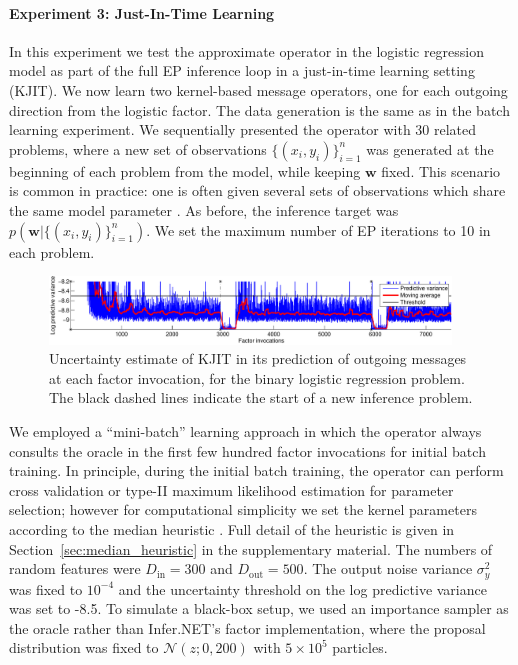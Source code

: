 \documentclass[english]{article}
\theoremstyle{plain}
\theoremstyle{plain}
\newcommand{\wjnote}[1]{ }
\newcommand{\secref}[1]{Section~\ref{#1}}
\begin{document}
\paragraph{Experiment 3: Just-In-Time Learning}
In this experiment we test the approximate operator in the logistic regression model as part of the full EP inference loop in a just-in-time learning setting (KJIT). %
We now learn two kernel-based message operators, one for each outgoing 
direction from the logistic factor. 
The data generation is the same as in the batch learning experiment.
We sequentially presented the operator with 30 related problems, where a new 
set of observations $\{(x_i, y_i)\}_{i=1}^n$ was generated at the beginning of 
each problem from the model, while keeping $\boldsymbol{w}$ fixed.
This scenario is common in practice: one is often given several sets of 
observations which share the same model parameter \citep{Eslami2014}. 
As before, the inference target was $p(\boldsymbol{w}|\{(x_i, y_i)\}_{i=1}^n)$.
We set the maximum number of EP iterations to 10 in each problem.

\begin{figure}[t]
\centering
\includegraphics[width=0.95\textwidth]{img/online/logistic_temporal_uncertainty-crop}
\caption{Uncertainty estimate of KJIT in its prediction of outgoing messages at each factor invocation,
for the binary logistic regression problem. The black dashed lines indicate the start 
of a new inference problem.
\label{fig:logistic_temporal_uncertainty}
}
\end{figure}


We employed a ``mini-batch'' learning approach in which the operator always consults the oracle in
the first few hundred factor invocations for initial batch training. 
In principle, during the initial batch training, the operator can perform 
cross validation or type-II maximum likelihood estimation for parameter
selection; however for computational simplicity
we set the kernel parameters  according to the median heuristic
\citep{Scholkopf2002}. Full detail of the heuristic is given in
\secref{sec:median_heuristic} in the supplementary material. 
The numbers 
of random features were $D_\mathrm{in} = 300$ and $D_\mathrm{out} = 500$. The output noise variance 
$\sigma^2_y$ was fixed to $10^{-4}$ and the uncertainty threshold on the log 
predictive variance was set to -8.5. To simulate a black-box setup, we used
an importance sampler as the oracle rather than Infer.NET's factor implementation, 
where the proposal distribution was fixed to $\mathcal{N}(z; 0, 200)$ with 
$5 \times 10^5$ particles.
\end{document}
